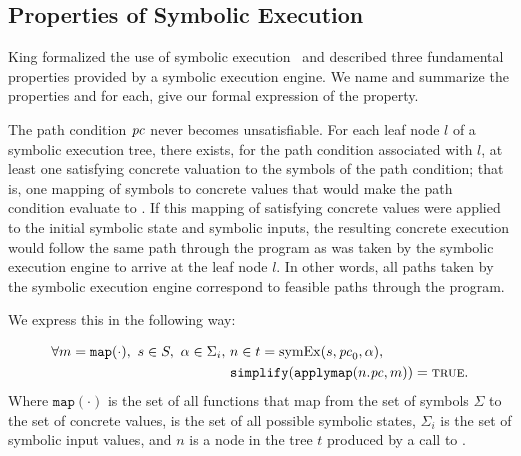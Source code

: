 \subsection{Properties of Symbolic Execution}
King formalized the use of symbolic execution~\cite{king1976symbolic} and
described three fundamental
properties provided by a symbolic execution engine. We name and summarize the properties
and for each, give our formal expression of the property.
\setcounter{property}{0}
\renewcommand{\theproperty}{K.\arabic{property}}
\begin{property}
  \label{prop:kingsound}
  The path condition $\mathit{pc}$ never becomes unsatisfiable. For each
  leaf node $l$ of a symbolic execution tree, there exists, for the path condition
  associated with $l$, at
  least one satisfying concrete valuation to the symbols of the path
  condition; that is, one mapping of symbols to concrete values that
  would make the path condition evaluate to \texttrue. If this mapping of satisfying concrete values were
  applied to the initial symbolic state and symbolic inputs, the resulting
  concrete execution would follow the same path through the program as was taken
  by the symbolic execution engine to arrive at the leaf node $l$. In other
  words, all paths taken by the symbolic execution engine correspond to feasible
  paths through the program.
  
  We express this in the following way: 
  

  \begin{align*}
    \forall m = \mathtt{map(\cdot)},~s \in S,~\alpha \in \Sigma_i,~& n \in t = \mathrm{symEx}(s,\mathit{pc}_0,\alpha), \\
    & \mathtt{simplify}(\mathtt{applymap}(n.\mathit{pc},m)) = \mathtt{\textsc{true}}.
  \end{align*}
  Where $\mathtt{map(\cdot)}$ is the set of all functions that map from the set
  of symbols $\Sigma$ to the set of concrete values, \symstates{} is the set of all
  possible symbolic states, $\Sigma_i$ is the set of symbolic input values, and $n$ is a node in the tree $t$ produced by a call
  to \symexecution.
\end{property}


